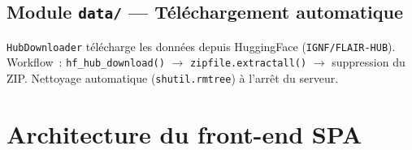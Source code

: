 \documentclass[a4paper, 11pt, french]{article}
\newcommand{\code}[1]{\texttt{#1}}
\begin{document}
\subsection{Module \code{data/} --- Téléchargement automatique}

\code{HubDownloader} télécharge les données depuis HuggingFace
(\code{IGNF/FLAIR-HUB}).  Workflow~: \code{hf\_hub\_download()} $\to$
\code{zipfile.extractall()} $\to$ suppression du ZIP.
Nettoyage automatique (\code{shutil.rmtree}) à l'arrêt du serveur.

\section{Architecture du front-end SPA}
\label{sec:archi-spa}
\end{document}
